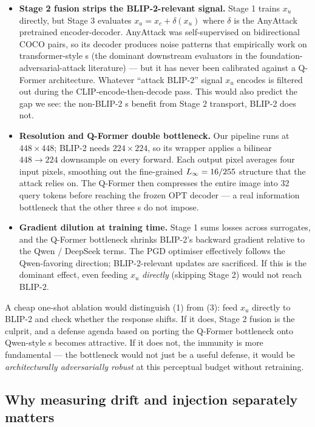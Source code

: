 \begin{itemize}
  \item \textbf{Stage 2 fusion strips the BLIP-2-relevant signal.} Stage 1 trains $x_u$ directly, but Stage 3 evaluates $x_a = x_c + \delta(x_u)$ where $\delta$ is the AnyAttack pretrained encoder-decoder. AnyAttack was self-supervised on bidirectional COCO pairs, so its decoder produces noise patterns that empirically work on transformer-style \vlm{}s (the dominant downstream evaluators in the foundation-adversarial-attack literature) --- but it has never been calibrated against a Q-Former architecture. Whatever ``attack BLIP-2'' signal $x_u$ encodes is filtered out during the CLIP-encode-then-decode pass. This would also predict the gap we see: the non-BLIP-2 \vlm{}s benefit from Stage 2 transport, BLIP-2 does not.
  \item \textbf{Resolution and Q-Former double bottleneck.} Our pipeline runs at $448 \times 448$; BLIP-2 needs $224 \times 224$, so its wrapper applies a bilinear $448 \to 224$ downsample on every forward. Each output pixel averages four input pixels, smoothing out the fine-grained $L_{\infty}{}=16/255$ structure that the attack relies on. The Q-Former then compresses the entire image into 32 query tokens before reaching the frozen OPT decoder --- a real information bottleneck that the other three \vlm{}s do not impose.
  \item \textbf{Gradient dilution at training time.} Stage 1 sums losses across surrogates, and the Q-Former bottleneck shrinks BLIP-2's backward gradient relative to the Qwen / DeepSeek terms. The PGD optimiser effectively follows the Qwen-favoring direction; BLIP-2-relevant updates are sacrificed. If this is the dominant effect, even feeding $x_u$ \emph{directly} (skipping Stage 2) would not reach BLIP-2.
\end{itemize}

A cheap one-shot ablation would distinguish (1) from (3): feed $x_u$ directly to BLIP-2 and check whether the response shifts. If it does, Stage 2 fusion is the culprit, and a defense agenda based on porting the Q-Former bottleneck onto Qwen-style \vlm{}s becomes attractive. If it does not, the immunity is more fundamental --- the bottleneck would not just be a useful defense, it would be \emph{architecturally adversarially robust} at this perceptual budget without retraining.

\subsection{Why measuring drift and injection separately matters}

